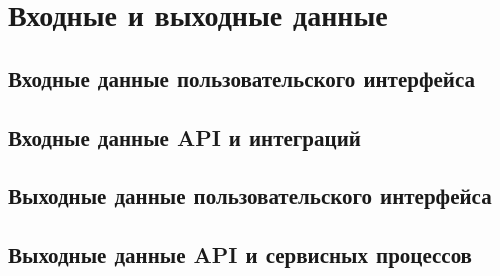 \section{Входные и выходные данные}

\subsection{Входные данные пользовательского интерфейса}

\subsection{Входные данные API и интеграций}

\subsection{Выходные данные пользовательского интерфейса}

\subsection{Выходные данные API и сервисных процессов}